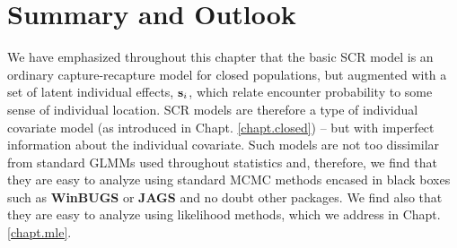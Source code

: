 {{



\section{ Summary and Outlook }

We have emphasized throughout this chapter that the basic SCR
model is an ordinary capture-recapture model for
closed populations, but augmented with a set
of latent individual effects, ${\bf s}_{i}$, which relate encounter
probability to some sense of individual location. SCR models are
therefore a type of individual covariate model (as introduced in
Chapt. \ref{chapt.closed}) -- but with imperfect information about the
individual covariate. 
Such models are not too dissimilar from standard GLMMs used throughout
statistics and, therefore, we 
find that they are  easy to analyze using standard MCMC
methods encased in black boxes such as {\bf WinBUGS} or {\bf JAGS} and
no doubt other packages. We find also that they are easy to analyze using
likelihood methods, which we address in Chapt. \ref{chapt.mle}.

}}
